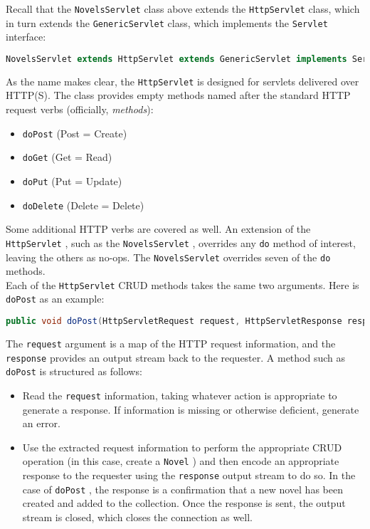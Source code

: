 \documentclass[12pt]{article}
\begin{document}
Recall that the \verb|NovelsServlet| class above extends the \verb|HttpServlet| class, which in turn extends the \verb|GenericServlet| class, which implements the \verb|Servlet| interface:\\

\begin{lstlisting}[language=java]
NovelsServlet extends HttpServlet extends GenericServlet implements Servlet

\end{lstlisting}

As the name makes clear, the \verb|HttpServlet| is designed for servlets delivered over HTTP(S). The class provides empty methods named after the standard HTTP request verbs (officially, \textit{methods}):\\

\begin{itemize}
	\item \verb|doPost| (Post = Create)
	\item \verb|doGet| (Get = Read)
	\item \verb|doPut| (Put = Update)
	\item \verb|doDelete| (Delete = Delete)
\end{itemize}

Some additional HTTP verbs are covered as well. An extension of the \verb|HttpServlet| , such as the \verb|NovelsServlet| , overrides any \verb|do| method of interest, leaving the others as no-ops. The \verb|NovelsServlet| overrides seven of the \verb|do| methods.\\

Each of the \verb|HttpServlet| CRUD methods takes the same two arguments. Here is \verb|doPost| as an example:\\

\begin{lstlisting}[language=java]
public void doPost(HttpServletRequest request, HttpServletResponse response) {

\end{lstlisting}

The \verb|request| argument is a map of the HTTP request information, and the \verb|response| provides an output stream back to the requester. A method such as \verb|doPost| is structured as follows:\\

\begin{itemize}
	\item Read the \verb|request| information, taking whatever action is appropriate to generate a response. If information is missing or otherwise deficient, generate an error.
	\item Use the extracted request information to perform the appropriate CRUD operation (in this case, create a \verb|Novel| ) and then encode an appropriate response to the requester using the \verb|response| output stream to do so. In the case of \verb|doPost| , the response is a confirmation that a new novel has been created and added to the collection. Once the response is sent, the output stream is closed, which closes the connection as well.
\end{itemize}
\end{document}
